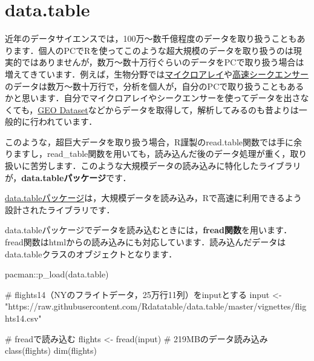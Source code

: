\documentclass[
  letterpaper,
  DIV=11,
  numbers=noendperiod]{scrreprt}
\newenvironment{Shaded}{\begin{snugshade}}{\end{snugshade}}
\newcommand{\CommentTok}[1]{\textcolor[rgb]{0.37,0.37,0.37}{#1}}
\newcommand{\FunctionTok}[1]{\textcolor[rgb]{0.28,0.35,0.67}{#1}}
\newcommand{\NormalTok}[1]{\textcolor[rgb]{0.00,0.23,0.31}{#1}}
\newcommand{\OtherTok}[1]{\textcolor[rgb]{0.00,0.23,0.31}{#1}}
\newcommand{\SpecialCharTok}[1]{\textcolor[rgb]{0.37,0.37,0.37}{#1}}
\newcommand{\StringTok}[1]{\textcolor[rgb]{0.13,0.47,0.30}{#1}}
\begin{document}
\hypertarget{data.table}{%
\section{data.table}\label{data.table}}

近年のデータサイエンスでは，100万～数千億程度のデータを取り扱うこともあります．個人のPCでRを使ってこのような超大規模のデータを取り扱うのは現実的ではありませんが，数万～数十万行ぐらいのデータをPCで取り扱う場合は増えてきています．例えば，生物分野では\href{https://ja.wikipedia.org/wiki/\%E3\%83\%9E\%E3\%82\%A4\%E3\%82\%AF\%E3\%83\%AD\%E3\%82\%A2\%E3\%83\%AC\%E3\%82\%A4}{マイクロアレイ}や\href{https://jp.illumina.com/content/dam/illumina-marketing/apac/japan/documents/pdf/primer_illumina_sequencing_introduction-j.pdf}{高速シークエンサー}のデータは数万～数十万行で，分析を個人が，自分のPCで取り扱うこともあるかと思います．自分でマイクロアレイやシークエンサーを使ってデータを出さなくても，\href{https://www.ncbi.nlm.nih.gov/gds}{GEO
Dataset}などからデータを取得して，解析してみるのも昔よりは一般的に行われています．

このような，超巨大データを取り扱う場合，R謹製のread.table関数では手に余りますし，read\_table関数を用いても，読み込んだ後のデータ処理が重く，取り扱いに苦労します．このような大規模データの読み込みに特化したライブラリが，\textbf{data.tableパッケージ}です．

\href{https://cran.r-project.org/web/packages/data.table/vignettes/datatable-intro.html}{data.tableパッケージ}は，大規模データを読み込み，Rで高速に利用できるよう設計されたライブラリです．

data.tableパッケージでデータを読み込むときには，\textbf{fread関数}を用います．fread関数はhtmlからの読み込みにも対応しています．読み込んだデータはdata.tableクラスのオブジェクトとなります．

\begin{Shaded}
\begin{Highlighting}[]
\NormalTok{pacman}\SpecialCharTok{::}\FunctionTok{p\_load}\NormalTok{(data.table)}

\CommentTok{\# flights14（NYのフライトデータ，25万行11列）をinputとする}
\NormalTok{input }\OtherTok{\textless{}{-}} \StringTok{"https://raw.githubusercontent.com/Rdatatable/data.table/master/vignettes/flights14.csv"}

\CommentTok{\# freadで読み込む}
\NormalTok{flights }\OtherTok{\textless{}{-}} \FunctionTok{fread}\NormalTok{(input) }\CommentTok{\# 219MBのデータ読み込み}
\FunctionTok{class}\NormalTok{(flights)}
\FunctionTok{dim}\NormalTok{(flights)}
\end{Highlighting}
\end{Shaded}
\end{document}
